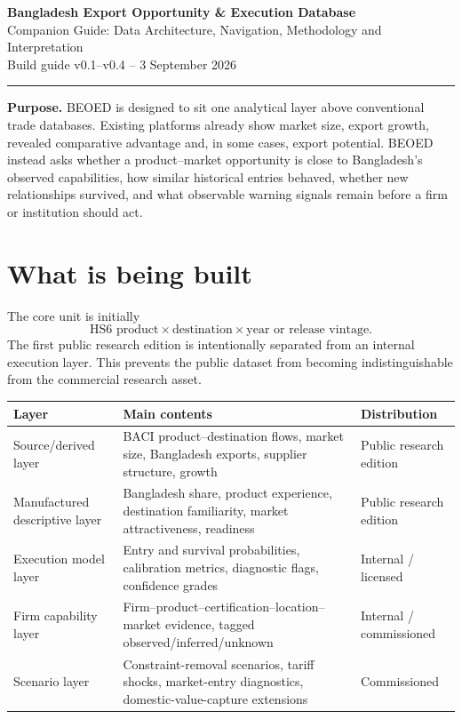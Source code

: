 \documentclass[11pt]{article}
\begin{document}
\begin{center}
{\LARGE\bfseries Bangladesh Export Opportunity \& Execution Database}\\[3pt]
{\large Companion Guide: Data Architecture, Navigation, Methodology and Interpretation}\\[6pt]
{\small Build guide v0.1--v0.4 -- 3 September 2026}
\end{center}
\vspace{4pt}\hrule\vspace{8pt}

\textbf{Purpose.} BEOED is designed to sit one analytical layer above conventional trade databases. Existing platforms already show market size, export growth, revealed comparative advantage and, in some cases, export potential. BEOED instead asks whether a product--market opportunity is close to Bangladesh's observed capabilities, how similar historical entries behaved, whether new relationships survived, and what observable warning signals remain before a firm or institution should act.

\section{What is being built}
The core unit is initially
\[
\text{HS6 product}\times\text{destination}\times\text{year or release vintage}.
\]
The first public research edition is intentionally separated from an internal execution layer. This prevents the public dataset from becoming indistinguishable from the commercial research asset.

\begin{center}
\small
\begin{tabularx}{0.96\textwidth}{>{\raggedright\arraybackslash}p{3.0cm} X X}
\toprule
Layer & Main contents & Distribution \\
\midrule
Source/derived layer & BACI product--destination flows, market size, Bangladesh exports, supplier structure, growth & Public research edition \\
Manufactured descriptive layer & Bangladesh share, product experience, destination familiarity, market attractiveness, readiness & Public research edition \\
Execution model layer & Entry and survival probabilities, calibration metrics, diagnostic flags, confidence grades & Internal / licensed \\
Firm capability layer & Firm--product--certification--location--market evidence, tagged observed/inferred/unknown & Internal / commissioned \\
Scenario layer & Constraint-removal scenarios, tariff shocks, market-entry diagnostics, domestic-value-capture extensions & Commissioned \\
\bottomrule
\end{tabularx}
\end{center}
\end{document}
